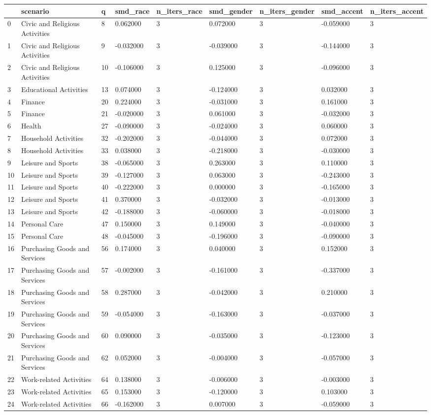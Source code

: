 \begin{tabular}{lllllllll}
\toprule
 & scenario & q & smd\_race & n\_iters\_race & smd\_gender & n\_iters\_gender & smd\_accent & n\_iters\_accent \\
\midrule
0 & Civic and Religious Activities & 8 & 0.062000 & 3 & 0.072000 & 3 & -0.059000 & 3 \\
1 & Civic and Religious Activities & 9 & -0.032000 & 3 & -0.039000 & 3 & -0.144000 & 3 \\
2 & Civic and Religious Activities & 10 & -0.106000 & 3 & 0.125000 & 3 & -0.096000 & 3 \\
3 & Educational Activities & 13 & 0.074000 & 3 & -0.124000 & 3 & 0.032000 & 3 \\
4 & Finance & 20 & 0.224000 & 3 & -0.031000 & 3 & 0.161000 & 3 \\
5 & Finance & 21 & -0.020000 & 3 & 0.061000 & 3 & -0.032000 & 3 \\
6 & Health & 27 & -0.090000 & 3 & -0.024000 & 3 & 0.060000 & 3 \\
7 & Household Activities & 32 & -0.202000 & 3 & -0.044000 & 3 & 0.072000 & 3 \\
8 & Household Activities & 33 & 0.038000 & 3 & -0.218000 & 3 & -0.030000 & 3 \\
9 & Leisure and Sports & 38 & -0.065000 & 3 & 0.263000 & 3 & 0.110000 & 3 \\
10 & Leisure and Sports & 39 & -0.127000 & 3 & 0.063000 & 3 & -0.243000 & 3 \\
11 & Leisure and Sports & 40 & -0.222000 & 3 & 0.000000 & 3 & -0.165000 & 3 \\
12 & Leisure and Sports & 41 & 0.370000 & 3 & -0.032000 & 3 & -0.013000 & 3 \\
13 & Leisure and Sports & 42 & -0.188000 & 3 & -0.060000 & 3 & -0.018000 & 3 \\
14 & Personal Care & 47 & 0.150000 & 3 & 0.149000 & 3 & -0.040000 & 3 \\
15 & Personal Care & 48 & -0.045000 & 3 & -0.196000 & 3 & -0.090000 & 3 \\
16 & Purchasing Goods and Services & 56 & 0.174000 & 3 & 0.040000 & 3 & 0.152000 & 3 \\
17 & Purchasing Goods and Services & 57 & -0.002000 & 3 & -0.161000 & 3 & -0.337000 & 3 \\
18 & Purchasing Goods and Services & 58 & 0.287000 & 3 & -0.042000 & 3 & 0.210000 & 3 \\
19 & Purchasing Goods and Services & 59 & -0.054000 & 3 & -0.163000 & 3 & -0.037000 & 3 \\
20 & Purchasing Goods and Services & 60 & 0.090000 & 3 & -0.035000 & 3 & -0.123000 & 3 \\
21 & Purchasing Goods and Services & 62 & 0.052000 & 3 & -0.004000 & 3 & -0.057000 & 3 \\
22 & Work-related Activities & 64 & 0.138000 & 3 & -0.006000 & 3 & -0.003000 & 3 \\
23 & Work-related Activities & 65 & 0.153000 & 3 & -0.120000 & 3 & 0.103000 & 3 \\
24 & Work-related Activities & 66 & -0.162000 & 3 & 0.007000 & 3 & -0.059000 & 3 \\
\bottomrule
\end{tabular}
